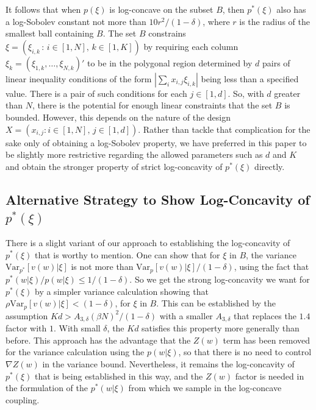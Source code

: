 \documentclass{article}
\numberwithin{equation}{section}
\theoremstyle{Lemma}
\theoremstyle{Corollary}
\theoremstyle{Theorem}
\theoremstyle{Remark}
\begin{document}
It follows that when $p(\xi)$ is log-concave on the subset $B$, then $p^*(\xi)$ also has a log-Sobolev constant not more than $10r^2/(1-\delta)$, where $r$ is the radius of the smallest ball containing $B$.
The set $B$ constrains $\xi=(\xi_{i,k}\, : \, i \in [1,N],\, k \in [1,K])$ by requiring each column $\xi_k=(\xi_{1,k},\ldots,\xi_{N,k})'$ to be in the polygonal region determined by $d$ pairs of linear inequality conditions of the form $|\sum_i x_{i,j} \xi_{i,k}|$ being less than a specified value.  There is a pair of such conditions for each $j \in [1,d]$.  So, with $d$ greater than $N$, there is the potential for enough linear constraints that the set $B$ is bounded. However, this depends on the nature of the design $X=(x_{i,j}: i \in [1,N], \, j \in [1,d])$. Rather than tackle that complication for the sake only of obtaining a log-Sobolev property, we have preferred in this paper to be slightly more restrictive regarding the allowed parameters such as $d$ and $K$ and obtain the stronger property of strict log-concavity of $p^*(\xi)$ directly. 


\subsection{Alternative Strategy to Show Log-Concavity of $p^*(\xi)$}\label{Alternative_app}

There is a slight variant of our approach to establishing the log-concavity of $p^*(\xi)$ that is worthy to mention. One can show that for $\xi$ in $B$, the variance $\text{Var}_{p^*} [v(w)|\xi]$ is not more than $\text{Var}_p [v(w)|\xi]/(1-\delta)$, using the fact that $p^*(w|\xi)/p(w|\xi) \le 1/(1-\delta)$. 
So we get the strong log-concavity we want for $p^*(\xi)$ by a simpler variance calculation showing that $\rho \text{Var}_p [v(w)|\xi] < (1-\delta)$, for $\xi$ in $B$.  This can be established by the assumption $Kd > A_{3,\delta} (\beta N)^2/(1-\delta)$ with a smaller $A_{3,\delta}$ that replaces the $1.4$ factor with $1$. With small $\delta$, the $Kd$ satisfies this property more generally than before. This approach has the advantage that the $Z(w)$ term has been removed for the variance calculation using the $p(w|\xi)$, so that there is no need to control $\nabla Z(w)$ in the variance bound.  Nevertheless, it remains the log-concavity of $p^*(\xi)$ that is being established in this way, and the $Z(w)$ factor is needed in the formulation of the $p^*(w|\xi)$ from which we sample in the log-concave coupling.
\end{document}
